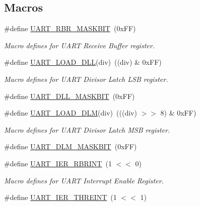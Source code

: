 \subsection*{Macros}
\begin{DoxyCompactItemize}
\item 
\#define \hyperlink{group___u_a_r_t__18_x_x__43_x_x_ga06774e65c2ca095c4373122ed9a390b8}{U\+A\+R\+T\+\_\+\+R\+B\+R\+\_\+\+M\+A\+S\+K\+B\+IT}~(0x\+F\+F)
\begin{DoxyCompactList}\small\item\em Macro defines for U\+A\+RT Receive Buffer register. \end{DoxyCompactList}\item 
\#define \hyperlink{group___u_a_r_t__18_x_x__43_x_x_ga55a89461d99a43769772276e51a6710a}{U\+A\+R\+T\+\_\+\+L\+O\+A\+D\+\_\+\+D\+LL}(div)~((div) \& 0x\+F\+F)
\begin{DoxyCompactList}\small\item\em Macro defines for U\+A\+RT Divisor Latch L\+SB register. \end{DoxyCompactList}\item 
\#define \hyperlink{group___u_a_r_t__18_x_x__43_x_x_ga85050a24048ffc2de997cd60ea67f9df}{U\+A\+R\+T\+\_\+\+D\+L\+L\+\_\+\+M\+A\+S\+K\+B\+IT}~(0x\+F\+F)
\item 
\#define \hyperlink{group___u_a_r_t__18_x_x__43_x_x_gac53f4cc36f13edd3fdf7fd9bab1360e2}{U\+A\+R\+T\+\_\+\+L\+O\+A\+D\+\_\+\+D\+LM}(div)~(((div) $>$$>$ 8) \& 0x\+F\+F)
\begin{DoxyCompactList}\small\item\em Macro defines for U\+A\+RT Divisor Latch M\+SB register. \end{DoxyCompactList}\item 
\#define \hyperlink{group___u_a_r_t__18_x_x__43_x_x_gaf4d480e07f82896893e45b572adeffcd}{U\+A\+R\+T\+\_\+\+D\+L\+M\+\_\+\+M\+A\+S\+K\+B\+IT}~(0x\+F\+F)
\item 
\#define \hyperlink{group___u_a_r_t__18_x_x__43_x_x_gafe8ecd345fb121d6b0ce19f4ce6672ba}{U\+A\+R\+T\+\_\+\+I\+E\+R\+\_\+\+R\+B\+R\+I\+NT}~(1 $<$$<$ 0)
\begin{DoxyCompactList}\small\item\em Macro defines for U\+A\+RT Interrupt Enable Register. \end{DoxyCompactList}\item 
\#define \hyperlink{group___u_a_r_t__18_x_x__43_x_x_gaa0d5f875782af503852f8b8f93292673}{U\+A\+R\+T\+\_\+\+I\+E\+R\+\_\+\+T\+H\+R\+E\+I\+NT}~(1 $<$$<$ 1)
\item 
$$
\end{DoxyCompactItemize}
